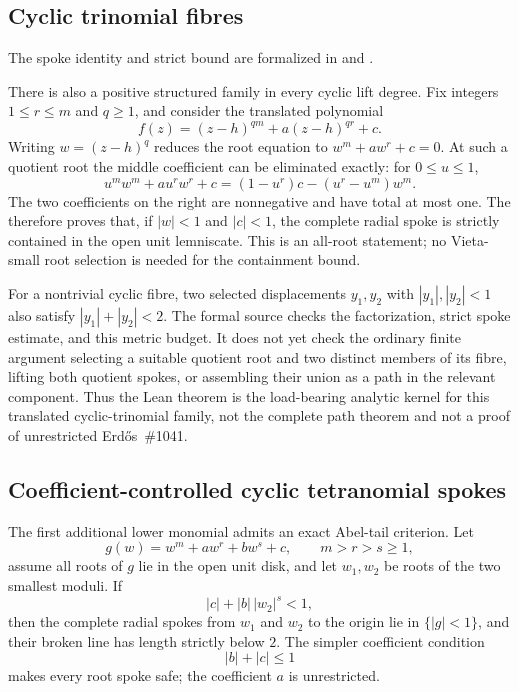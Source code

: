 \subsection*{Cyclic trinomial fibres}

The spoke identity and strict bound are formalized in
and .

There is also a positive structured family in every cyclic lift degree.  Fix
integers $1\le r\le m$ and $q\ge1$, and consider the translated polynomial
\[
 f(z)=(z-h)^{qm}+a(z-h)^{qr}+c.
\]
Writing $w=(z-h)^q$ reduces the root equation to
$w^m+aw^r+c=0$.  At such a quotient root the middle coefficient can be
eliminated exactly: for $0\le u\le1$,
\[
 u^mw^m+au^rw^r+c
   =(1-u^r)c-(u^r-u^m)w^m.
\]
The two coefficients on the right are nonnegative and have total at most one.
The 
therefore proves that, if $|w|<1$ and $|c|<1$, the complete radial spoke
is strictly contained in the open unit lemniscate.  This is an all-root
statement; no Vieta-small root selection is needed for the containment bound.

For a nontrivial cyclic fibre, two selected displacements $y_1,y_2$ with
$|y_1|,|y_2|<1$ also satisfy $|y_1|+|y_2|<2$.  The formal source checks the
factorization, strict spoke estimate, and this metric budget.  It does not yet
check the ordinary finite argument selecting a suitable quotient root and two
distinct members of its fibre, lifting both quotient spokes, or assembling
their union as a path in the relevant component.  Thus the Lean theorem is the
load-bearing analytic kernel for this translated cyclic-trinomial family, not
the complete path theorem and not a proof of unrestricted Erd\H{o}s~\#1041.

\subsection*{Coefficient-controlled cyclic tetranomial spokes}

The first additional lower monomial admits an exact Abel-tail criterion.  Let
\[
  g(w)=w^m+aw^r+bw^s+c,\qquad m>r>s\ge1,
\]
assume all roots of $g$ lie in the open unit disk, and let $w_1,w_2$ be roots
of the two smallest moduli.  If
\[
  |c|+|b|\,|w_2|^s<1,
\]
then the complete radial spokes from $w_1$ and $w_2$ to the origin lie in
$\{|g|<1\}$, and their broken line has length strictly below $2$.  The simpler
coefficient condition
\[
  |b|+|c|\le1
\]
makes every root spoke safe; the coefficient $a$ is unrestricted.

